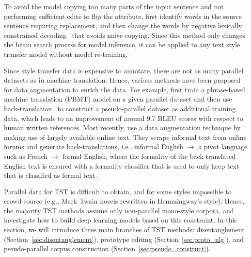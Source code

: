 To avoid the model copying too many parts of the input sentence and not performing sufficient edits to flip the attribute,  first identify words in the source sentence requiring replacement, and then change the words by negative lexically constrained decoding~ that avoids naive copying. Since this method only changes the beam search process for model inference, it can be applied to any text style transfer model without model re-training.

Since style transfer data is expensive to annotate, there are not as many parallel datasets as in machine translation. Hence, various methods have been proposed for data augmentation to enrich the data. For example,  first train a phrase-based machine translation (PBMT) model on a given parallel dataset and then use back-translation~ to construct a pseudo-parallel dataset as additional training data, which leads to an improvement of around 9.7 BLEU scores with respect to human written references.
Most recently,  use a data augmentation technique by making use of largely available online text. They scrape informal text from online forums and generate back-translations, i.e., informal English $\rightarrow$ a pivot language such as French $\rightarrow$ formal English, where the formality of the back-translated English text is ensured with  a formality classifier that is used to only keep text that is classified as formal text.

\label{sec:unsup}
Parallel data for TST is difficult to obtain, and for some styles impossible to crowd-source (e.g., Mark Twain novels rewritten in Hemmingway's style). Hence, the majority TST methods assume only non-parallel mono-style corpora, and investigate how to build deep learning models based on this constraint.
In this section, we will introduce three main branches of TST methods: disentanglement (Section~\ref{sec:disentanglement}), prototype editing (Section~\ref{sec:proto_nlg}), and pseudo-parallel corpus construction (Section~\ref{sec:pseudo_construct}).

